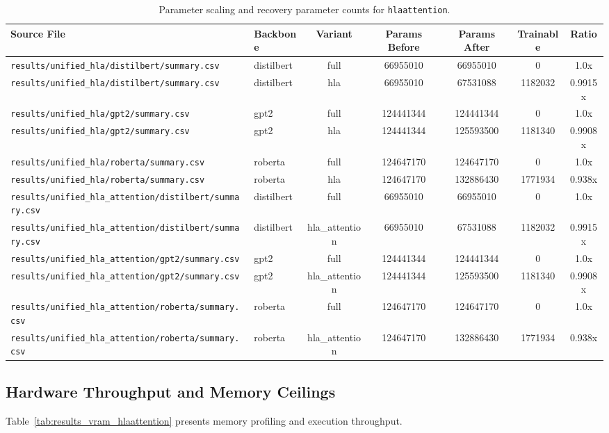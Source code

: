 \begin{table}[t]
\centering
\small
\begin{tabular}{llccccc}
\toprule
\textbf{Source File} & \textbf{Backbone} & \textbf{Variant} & \textbf{Params Before} & \textbf{Params After} & \textbf{Trainable} & \textbf{Ratio} \\
\midrule
\texttt{results/unified\_hla/distilbert/summary.csv} & distilbert & full & 66955010 & 66955010 & 0 & 1.0x \\
\texttt{results/unified\_hla/distilbert/summary.csv} & distilbert & hla & 66955010 & 67531088 & 1182032 & 0.9915x \\
\texttt{results/unified\_hla/gpt2/summary.csv} & gpt2 & full & 124441344 & 124441344 & 0 & 1.0x \\
\texttt{results/unified\_hla/gpt2/summary.csv} & gpt2 & hla & 124441344 & 125593500 & 1181340 & 0.9908x \\
\texttt{results/unified\_hla/roberta/summary.csv} & roberta & full & 124647170 & 124647170 & 0 & 1.0x \\
\texttt{results/unified\_hla/roberta/summary.csv} & roberta & hla & 124647170 & 132886430 & 1771934 & 0.938x \\
\texttt{results/unified\_hla\_attention/distilbert/summary.csv} & distilbert & full & 66955010 & 66955010 & 0 & 1.0x \\
\texttt{results/unified\_hla\_attention/distilbert/summary.csv} & distilbert & hla\_attention & 66955010 & 67531088 & 1182032 & 0.9915x \\
\texttt{results/unified\_hla\_attention/gpt2/summary.csv} & gpt2 & full & 124441344 & 124441344 & 0 & 1.0x \\
\texttt{results/unified\_hla\_attention/gpt2/summary.csv} & gpt2 & hla\_attention & 124441344 & 125593500 & 1181340 & 0.9908x \\
\texttt{results/unified\_hla\_attention/roberta/summary.csv} & roberta & full & 124647170 & 124647170 & 0 & 1.0x \\
\texttt{results/unified\_hla\_attention/roberta/summary.csv} & roberta & hla\_attention & 124647170 & 132886430 & 1771934 & 0.938x \\
\bottomrule
\end{tabular}
\caption{Parameter scaling and recovery parameter counts for \texttt{hlaattention}.}
\label{tab:results_params_hlaattention}
\end{table}

\subsection{Hardware Throughput and Memory Ceilings}
Table~\ref{tab:results_vram_hlaattention} presents memory profiling and execution throughput.

